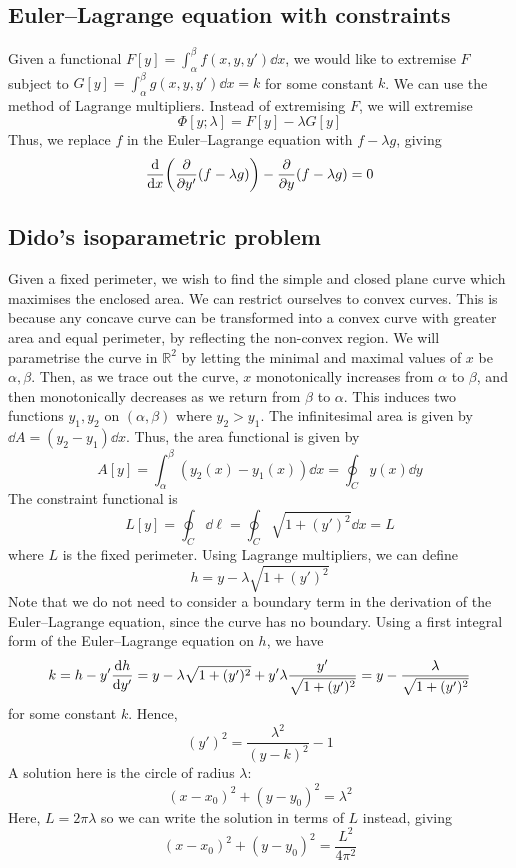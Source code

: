 \subsection{Euler--Lagrange equation with constraints}
Given a functional \( F[y] = \int_\alpha^\beta f(x,y,y') \dd{x} \), we would like to extremise \( F \) subject to \( G[y] = \int_\alpha^\beta g(x,y,y') \dd{x} = k \) for some constant \( k \).
We can use the method of Lagrange multipliers.
Instead of extremising \( F \), we will extremise
\[
	\Phi[y;\lambda] = F[y] - \lambda G[y]
\]
Thus, we replace \( f \) in the Euler--Lagrange equation with \( f - \lambda g \), giving
\[
	\dv{x}\qty(\pdv{y'}(f-\lambda g)) - \pdv{y}(f-\lambda g) = 0
\]

\subsection{Dido's isoparametric problem}
Given a fixed perimeter, we wish to find the simple and closed plane curve which maximises the enclosed area.
We can restrict ourselves to convex curves.
This is because any concave curve can be transformed into a convex curve with greater area and equal perimeter, by reflecting the non-convex region.
We will parametrise the curve in \( \mathbb R^2 \) by letting the minimal and maximal values of \( x \) be \( \alpha, \beta \).
Then, as we trace out the curve, \( x \) monotonically increases from \( \alpha \) to \( \beta \), and then monotonically decreases as we return from \( \beta \) to \( \alpha \).
This induces two functions \( y_1, y_2 \) on \( (\alpha, \beta) \) where \( y_2 > y_1 \).
The infinitesimal area is given by \( \dd{A} = (y_2 - y_1) \dd{x} \).
Thus, the area functional is given by
\[
	A[y] = \int_\alpha^\beta (y_2(x) - y_1(x))\dd{x} = \oint_C y(x) \dd{y}
\]
The constraint functional is
\[
	L[y] = \oint_C \dd{\ell} = \oint_C \sqrt{1 + (y')^2} \dd{x} = L
\]
where \( L \) is the fixed perimeter.
Using Lagrange multipliers, we can define
\[
	h = y - \lambda \sqrt{1 + (y')^2}
\]
Note that we do not need to consider a boundary term in the derivation of the Euler--Lagrange equation, since the curve has no boundary.
Using a first integral form of the Euler--Lagrange equation on \( h \), we have
\[
	k = h - y'\dv{h}{y'} = y - \lambda \sqrt{1 + (y')^2} + y' \lambda \frac{y'}{\sqrt{1 + (y')^2}} = y - \frac{\lambda}{\sqrt{1 + (y')^2}}
\]
for some constant \( k \).
Hence,
\[
	(y')^2 = \frac{\lambda^2}{(y - k)^2} - 1
\]
A solution here is the circle of radius \( \lambda \):
\[
	(x - x_0)^2 + (y - y_0)^2 = \lambda^2
\]
Here, \( L = 2 \pi \lambda \) so we can write the solution in terms of \( L \) instead, giving
\[
	(x - x_0)^2 + (y - y_0)^2 = \frac{L^2}{4\pi^2}
\]

